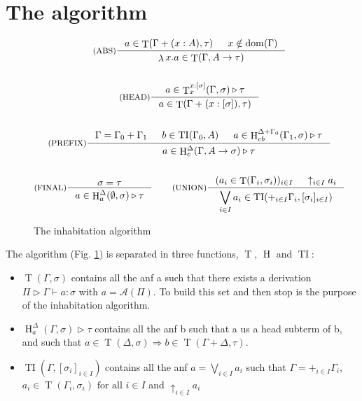 \documentclass{article}
\DeclareMathOperator{\iT}{T}
\DeclareMathOperator{\iH}{H}
\DeclareMathOperator{\iTI}{TI}
\DeclareMathOperator{\iDom}{dom}
\DeclareMathOperator{\iLambda}{\lambda}
\begin{document}
\section{The algorithm}
\begin{figure}[h]
    \begin{mdframed}
        \begin{gather*}
            \inference[(ABS)]{a \in \iT(\Gamma + (x : A), \tau) & x \notin \iDom(\Gamma)}{\iLambda x.a \in \iT(\Gamma, A \rightarrow \tau)}
            \\ \\
            \inference[(HEAD)]{a \in \iT^{x:[\sigma]}_x(\Gamma, \sigma) \triangleright \tau}{a \in\iT(\Gamma + (x:[\sigma]), \tau) }
            \\ \\
            \inference[(PREFIX)]{\Gamma = \Gamma_0 + \Gamma_1 & b \in \iTI(\Gamma_0, A) & a \in \iH^{\Delta + \Gamma_0}_{cb}(\Gamma_1, \sigma) \triangleright \tau}{a \in \iH^{\Delta}_c(\Gamma, A \rightarrow \sigma) \triangleright \tau}
            \\ \\
            \inference[(FINAL)]{\sigma = \tau}{a \in \iH^{\Delta}_a(\emptyset, \sigma) \triangleright \tau}
            \qquad
            \inference[(UNION)]{(a_i \in \iT(\Gamma_i, \sigma_i))_{i \in I} & \uparrow_{i \in I}a_i}{\displaystyle \bigvee_{i \in I} a_i \in \iTI(+_{i \in I}\Gamma_i, [\sigma_i]_{i \in I}) }
        \end{gather*}
    \end{mdframed}
  \caption{The inhabitation algorithm}
  \label{INH}
\end{figure}
The algorithm (Fig. \ref{INH}) is separated in three functions, $\iT$, $\iH$ and $\iTI$:
\begin{itemize}
\item $\iT(\Gamma, \sigma)$ contains all the anf a such that there exists a derivation $\Pi \triangleright \Gamma \vdash a : \sigma$ with $a = \mathcal{A}(\Pi)$. To build this set and then stop is the purpose of the inhabitation algorithm.
\item $\iH^\Delta_a(\Gamma, \sigma) \triangleright \tau$ contains all the anf b such that a us a head subterm of b, and such that $a \in \iT(\Delta, \sigma) \Rightarrow b \in \iT(\Gamma + \Delta, \tau)$.
\item $\iTI(\Gamma, [\sigma_i]_{i \in I})$ contains all the anf $a = \bigvee_{i\in I}a_i$ such that $ \Gamma = +_{i \in I} \Gamma_i $, $ a_i \in \iT(\Gamma_i, \sigma_i)\text{ for all }i \in I $ and $\uparrow_{i \in I}a_i$
\end{itemize}
\end{document}
